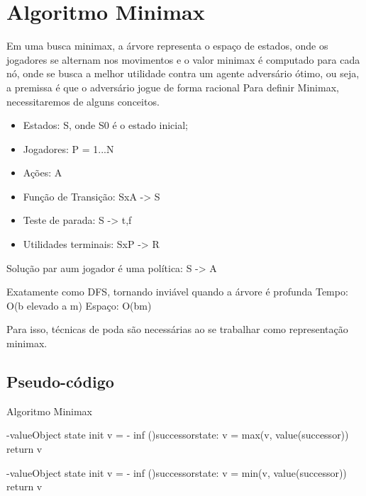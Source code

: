 \documentclass[sigplan,screen]{acmart}
\begin{document}
\section{Algoritmo Minimax}
Em uma busca minimax, a árvore representa o espaço de estados, onde os jogadores se alternam nos movimentos e o valor minimax é computado para cada nó, onde se busca a melhor utilidade contra um agente adversário ótimo, ou seja, a premissa é que o adversário jogue de forma racional
Para definir Minimax, necessitaremos de alguns conceitos.
\begin{itemize}
  \item{Estados: S, onde S0 é o estado inicial;}
  \item{Jogadores: P = {1...N}}
  \item{Ações: A}
  \item{Função de Transição: SxA -> S}
  \item{Teste de parada: S -> {t,f}}
  \item{Utilidades terminais: SxP -> R}
\end{itemize}

Solução par aum jogador é uma política: S -> A

Exatamente como DFS, tornando inviável quando a árvore é profunda
Tempo: O(b elevado a m)
Espaço: O(bm)

Para isso, técnicas de poda são necessárias ao se trabalhar como representação minimax.

\subsection{Pseudo-código}

\begin{algorithm}
\DontPrintSemicolon
  \caption{Algoritmo Minimax}
  \label{alg:generator}

  \max-value{Object state}{
    init v = - inf\;
    \ForEach(){successor}{state}:
    v = max(v, value(successor))\;
    return v\;
  }

  \min-value{Object state}{
    init v = - inf\;
    \ForEach(){successor}{state}:
    v = min(v, value(successor))\;
    return v\;
  }
\end{algorithm}
\end{document}
